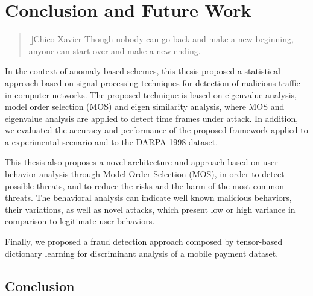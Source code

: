 \chapter{Conclusion and Future Work}
\label{ch:5_conclusionfuturework}

\begin{quotation}[]{Chico Xavier}
Though nobody can go back and make a new beginning, anyone can start over and make a new ending.
\end{quotation}


In the context of anomaly-based schemes, this thesis proposed a statistical approach based on signal processing techniques for detection of malicious traffic in computer networks. The proposed technique is based on eigenvalue analysis, model order selection (MOS) and eigen similarity analysis, where MOS and eigenvalue analysis are applied to detect time frames under attack. In addition, we evaluated the accuracy and performance of the proposed framework applied to a experimental scenario and to the DARPA 1998 dataset. 

This thesis also proposes a novel architecture and approach based on user behavior analysis through Model Order Selection (MOS), in order to detect possible threats, and to reduce the risks and the harm of the most common threats. The behavioral analysis can indicate well known malicious behaviors, their variations, as well as novel attacks, which present low or high variance in comparison to legitimate user behaviors. 

Finally, we proposed a fraud detection approach composed by tensor-based dictionary learning for discriminant analysis of a mobile payment dataset.

\section{Conclusion}
\label{sc:conc_conclusion}

